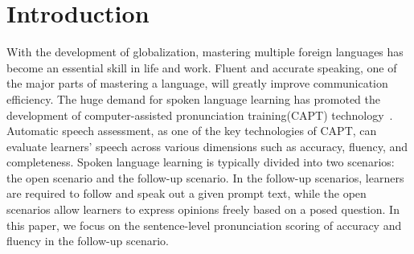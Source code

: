 \section{Introduction}
\label{sec:intro}
With the development of globalization, mastering multiple foreign languages has become an essential skill in life and work. Fluent and accurate speaking, one of the major parts of mastering a language, will greatly improve communication efficiency\cite{ex0}. The huge demand for spoken language learning has promoted the development of computer-assisted pronunciation training(CAPT) technology~\cite{chen2016computer,fouz2015trends}. Automatic speech assessment, as one of the key technologies of CAPT, can evaluate learners' speech across various dimensions such as accuracy, fluency, and completeness. Spoken language learning is typically divided into two scenarios: the open scenario and the follow-up scenario. In the follow-up scenarios, learners are required to follow and speak out a given prompt text, while the open scenarios allow learners to express opinions freely based on a posed question. In this paper, we focus on the sentence-level pronunciation scoring of accuracy and fluency in the follow-up scenario.

  
